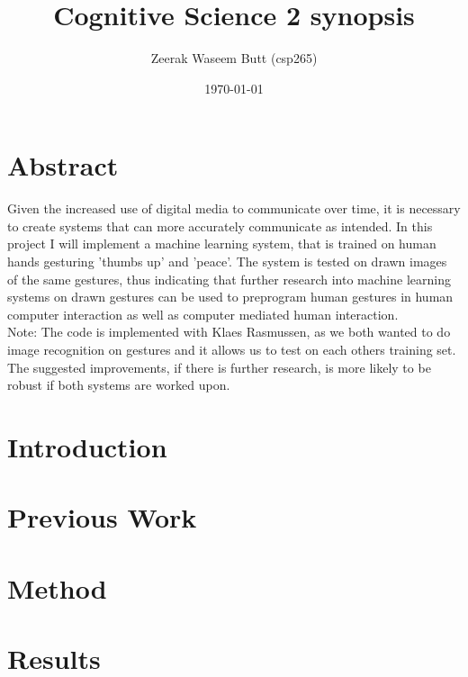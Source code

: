 \documentclass[10pt, a4paper]{article}
\begin{document}
\title{Cognitive Science 2 synopsis}
\author{Zeerak Waseem Butt (csp265)}
\date{\today}
\maketitle
\thispagestyle{empty}
\newpage
\tableofcontents
\thispagestyle{empty}
\newpage
\setcounter{page}{1}
\section{Abstract}
Given the increased use of digital media to communicate over time, it is necessary to create systems that can more accurately communicate as intended. In this project I will implement a machine learning system, that is trained on human hands gesturing 'thumbs up' and 'peace'. The system is tested on drawn images of the same gestures, thus indicating that further research into machine learning systems on drawn gestures can be used to preprogram human gestures in human computer interaction as well as computer mediated human interaction.\\

Note: The code is implemented with Klaes Rasmussen, as we both wanted to do image recognition on gestures and it allows us to test on each others training set. The suggested improvements, if there is further research, is more likely to be robust if both systems are worked upon.
\section{Introduction}

\section{Previous Work}
\section{Method}
\section{Results}
\begin{table}[h]
  \centering
  \caption{Best training parameters \& results}
  \label{fig:TrainAcc}
\end{table}
\end{document}

